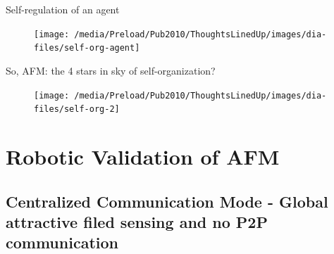\documentclass{beamer}
\begin{document}
\begin{frame}[t]{Self-regulation of an agent}  
\begin{figure}
\centering
\texttt{[image: /media/Preload/Pub2010/ThoughtsLinedUp/images/dia-files/self-org-agent]}
\label{fig:setup} %
\end{figure}
\end{frame}


\begin{frame}[t]{So, AFM: \alert{the 4 stars} in sky of self-organization?}  
\begin{figure}
\centering
\texttt{[image: /media/Preload/Pub2010/ThoughtsLinedUp/images/dia-files/self-org-2]}
\label{fig:setup} %
\end{figure}
\end{frame}


\section{Robotic Validation of AFM}

\subsection{Centralized Communication Mode - Global attractive filed sensing and no P2P communication}
\end{document}
